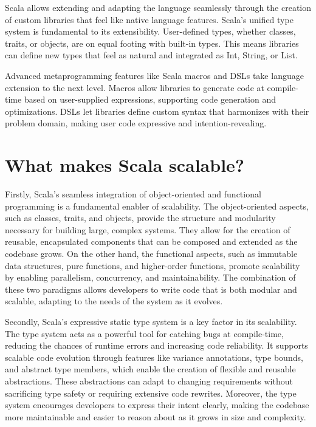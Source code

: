 Scala allows extending and adapting the language seamlessly through the creation of custom libraries that feel like native language features. Scala's unified type system is fundamental to its extensibility. User-defined types, whether classes, traits, or objects, are on equal footing with built-in types. This means libraries can define new types that feel as natural and integrated as Int, String, or List. 

Advanced metaprogramming features like Scala macros and DSLs take language extension to the next level. Macros allow libraries to generate code at compile-time based on user-supplied expressions, supporting code generation and optimizations. DSLs let libraries define custom syntax that harmonizes with their problem domain, making user code expressive and intention-revealing.\footnotemark {}

\section{What makes Scala scalable?}

Firstly, Scala's seamless integration of object-oriented and functional programming is a fundamental enabler of scalability. The object-oriented aspects, such as classes, traits, and objects, provide the structure and modularity necessary for building large, complex systems. They allow for the creation of reusable, encapsulated components that can be composed and extended as the codebase grows. On the other hand, the functional aspects, such as immutable data structures, pure functions, and higher-order functions, promote scalability by enabling parallelism, concurrency, and maintainability. The combination of these two paradigms allows developers to write code that is both modular and scalable, adapting to the needs of the system as it evolves.\footnotemark{}

Secondly, Scala's expressive static type system is a key factor in its scalability. The type system acts as a powerful tool for catching bugs at compile-time, reducing the chances of runtime errors and increasing code reliability. It supports scalable code evolution through features like variance annotations, type bounds, and abstract type members, which enable the creation of flexible and reusable abstractions.\footnotemark[\value{footnote}]  These abstractions can adapt to changing requirements without sacrificing type safety or requiring extensive code rewrites. Moreover, the type system encourages developers to express their intent clearly, making the codebase more maintainable and easier to reason about as it grows in size and complexity.\footnotemark {}

